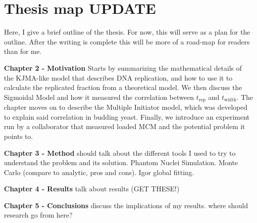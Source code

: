 		
	\section{Thesis map \textbf{UPDATE}}
	\label{sec:Map}

	Here, I give a brief outline of the thesis. For now, this will serve as a plan for the outline. After the writing is complete this will be more of a road-map for readers than for me.
	
	\textbf{Chapter 2 - Motivation}
	Starts by summarizing the mathematical details of the KJMA-like model that describes DNA replication, and how to use it to calculate the replicated fraction from a theoretical model.
	We then discuss the Sigmoidal Model and how it measured the correlation between $t_{\text{rep}}$ and $t_{\text{width}}$.
	The chapter moves on to describe the Multiple Initiator model, which was developed to explain said correlation in budding yeast.
	Finally, we introduce an experiment run by a collaborator that measured loaded MCM and the potential problem it points to.
	
	\textbf{Chapter 3 - Method}
	should talk about the different tools I used to try to understand the problem and its solution.
	Phantom Nuclei Simulation.
	Monte Carlo (compare to analytic, pros and cons).
	Igor global fitting.
	
	\textbf{Chapter 4 - Results}
	talk about results (GET THESE!)
	
	\textbf{Chapter 5 - Conclusions}
	discuss the implications of my results.
	where should research go from here?
		
		
		
		
		
		
		
		
		
		